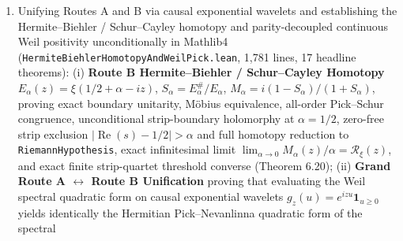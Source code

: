 \documentclass[
  11pt,
]{article}
\begin{document}
\begin{enumerate}
  headline theorems): (i) \textbf{Route A Universal Finite-Codimension
  Coercivity Theorem} proving via unit-circle complex Taylor remainders
  and moment orthogonality that for \textbf{every \(L > 0\)}
  (arbitrarily many active primes) and \textbf{every
  \(c \in \mathbb{R}\)}, \(W_{\text{total}}(L, g) \ge c\|g\|_{L^2}^2\)
  on \(V_N^\perp\) for an explicit finite codimension \(N\), together
  with the refined split prime-shift bound (Theorem 6.17); (ii)
  \textbf{Spectral Resolvent \& Herglotz--Pick Theory} on
  \(\mathcal{R}_\xi(z) = i\,(\xi'/\xi)(1/2 - iz)\), proving exact
  logarithmic-force and Cauchy--Riemann phase-derivative duality,
  Herglotz reduction to \texttt{RiemannHypothesis}, all-order Hermitian
  Pick--Nevanlinna matrix PSD, Schwarz--Pick contraction, exact
  Stieltjes--Perron IDOS integral, and \textbf{Remote Off-Line Zero
  Detection} with exact ratio
  \(\frac{\sigma^2 + \delta^2}{\sigma^2 - \delta^2} > 1\) at every
  height \(\sigma > \delta\) (Theorem 6.18); and (iii) \textbf{Route B
  All-Order 2D Light-Cone Parity Separation}, the \textbf{Local RH \&
  Zero-Simplicity Theorem}
  (\texttt{riemannHypothesis\_local\_and\_simple\_of\_hessianPos}), and
  compactified angular strip descent
  \(\beta(\theta) = \cos^2(\theta/2)\) with kinetic barrier
  \(2/\sin^2\theta \ge 2\) (Theorem 6.19).
\item
  Unifying Routes A and B via causal exponential wavelets and
  establishing the Hermite--Biehler / Schur--Cayley homotopy and
  parity-decoupled continuous Weil positivity unconditionally in
  Mathlib4 (\texttt{HermiteBiehlerHomotopyAndWeilPick.lean}, 1,781
  lines, 17 headline theorems): (i) \textbf{Route B Hermite--Biehler /
  Schur--Cayley Homotopy} \(E_\alpha(z) = \xi(1/2 + \alpha - iz)\),
  \(S_\alpha = E_\alpha^{\#}/E_\alpha\),
  \(M_\alpha = i(1 - S_\alpha)/(1 + S_\alpha)\), proving exact boundary
  unitarity, Möbius equivalence, all-order Pick--Schur congruence,
  unconditional strip-boundary holomorphy at \(\alpha = 1/2\), zero-free
  strip exclusion \(| \operatorname{Re}(s) - 1/2 | > \alpha\) and full
  homotopy reduction to \texttt{RiemannHypothesis}, exact infinitesimal
  limit \(\lim_{\alpha \to 0} M_\alpha(z)/\alpha = \mathcal{R}_\xi(z)\),
  and exact finite strip-quartet threshold converse (Theorem 6.20); (ii)
  \textbf{Grand Route A \(\leftrightarrow\) Route B Unification} proving
  that evaluating the Weil spectral quadratic form on causal exponential
  wavelets \(g_z(u) = e^{izu}\mathbf{1}_{u \ge 0}\) yields identically
  the Hermitian Pick--Nevanlinna quadratic form of the spectral

\end{enumerate}
\end{document}
